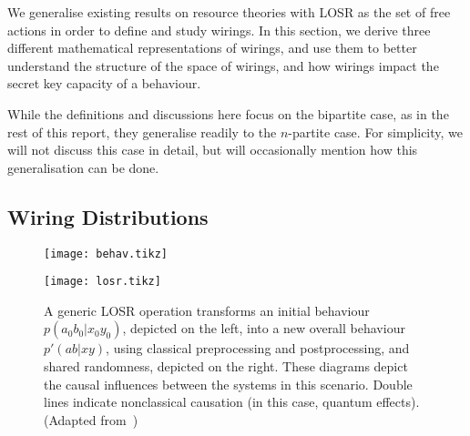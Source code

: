 \documentclass[10pt, a4paper]{article}
\numberwithin{equation}{section} %
\theoremstyle{definition}
\theoremstyle{plain}
\newcommand{\?}{\mathrel{?}} %
\begin{document}
              We generalise existing results on resource theories with LOSR as the set of free actions in order to define and study wirings. In this section, we derive three different mathematical representations of wirings, and use them to better understand the structure of the space of wirings, and how wirings impact the secret key capacity of a behaviour.

                While the definitions and discussions here focus on the bipartite case, as in the rest of this report, they generalise readily to the \(n\)-partite case. For simplicity, we will not discuss this case in detail, but will occasionally mention how this generalisation can be done.

              \subsection{Wiring Distributions}\label{sec:locwir_dist}

              \begin{figure}
                \centering
                \begin{minipage}{0.3\linewidth}
                  \centering
                  \texttt{[image: behav.tikz]}
                \end{minipage}
                \begin{minipage}{0.6\linewidth}
                  \centering
                  \texttt{[image: losr.tikz]}
                \end{minipage}
                  \caption[Causal influences in an LOSR operation on a quantum behaviour.]{\label{fig:losr} A generic LOSR operation transforms an initial behaviour \(p(a_0 b_0|x_0 y_0)\), depicted on the left, into a new overall behaviour \(p'(ab|xy)\), using classical preprocessing and postprocessing, and shared randomness, depicted on the right. These diagrams depict the causal influences between the systems in this scenario. Double lines indicate nonclassical causation (in this case, quantum effects). (Adapted from~\cite{NonclassicalCausation})}
                \end{figure}
\end{document}
